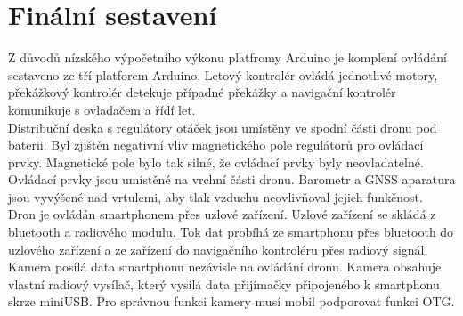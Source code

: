 \section{Finální sestavení}
Z důvodů nízského výpočetního výkonu platfromy Arduino je komplení ovládání sestaveno ze tří platforem Arduino. Letový kontrolér ovládá jednotlivé motory, překážkový kontrolér detekuje případné překážky a navigační kontrolér komunikuje s ovladačem a řídí let.\\
Distribuční deska s regulátory otáček jsou umístěny ve spodní části dronu pod baterii. Byl zjištěn negativní vliv magnetického pole regulátorů pro ovládací prvky. Magnetické pole bylo tak silné, že ovládací prvky byly neovladatelné. Ovládací prvky jsou umístěné na vrchní části dronu. Barometr a GNSS aparatura jsou vyvýšené nad vrtulemi, aby tlak vzduchu neovlivňoval jejich funkčnost.\\
Dron je ovládán smartphonem přes uzlové zařízení. Uzlové zařízení se skládá z bluetooth a radiového modulu. Tok dat probíhá ze smartphonu přes bluetooth do uzlového zařízení a ze zařízení do navigačního kontroléru přes radiový signál.\\
Kamera posílá data smartphonu nezávisle na ovládání dronu. Kamera obsahuje vlastní radiový vysílač, který vysílá data přijímačky připojeného k smartphonu skrze miniUSB. Pro správnou funkci kamery musí mobil podporovat funkci OTG.\\ 

